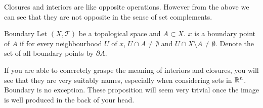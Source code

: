 \documentclass[a4paper]{article}
\begin{document}
Closures and interiors are like opposite operations. However from the above we can see that they are not opposite in the sense of set complements. 

\begin{defn}{Boundary}{} Let $(X,\mathcal{T})$ be a topological space and $A\subset X$. $x$ is a boundary point of $A$ if for every neighbourhood $U$ of $x$, $U\cap A\neq\emptyset$ and $U\cap X\setminus A\neq\emptyset$. Denote the set of all boundary points by $\partial A$. 
\end{defn}

If you are able to concretely graspe the meaning of interiors and closures, you will see that they are very suitably names, especially when considering sets in $\mathbb{R}^n$. Boundary is no exception. These proposition will seem very trivial once the image is well produced in the back of your head. 
\end{document}
